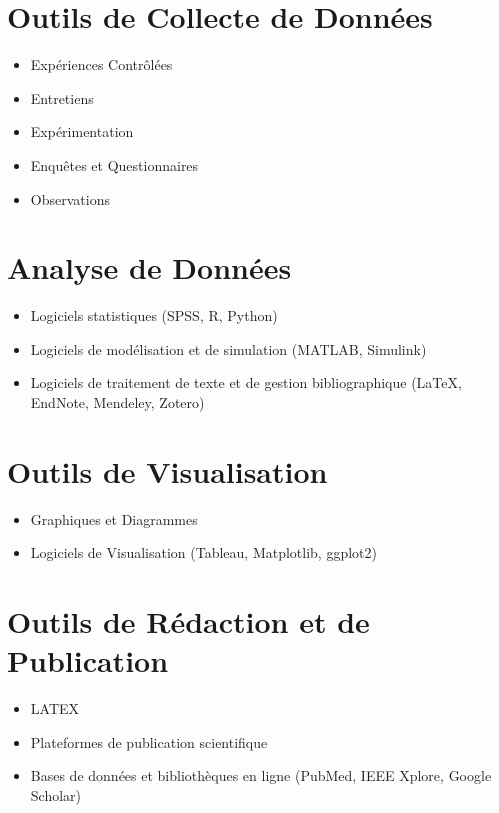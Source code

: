 \documentclass{article}
\begin{document}
\section*{Outils de Collecte de Données}
\begin{itemize}
    \item Expériences Contrôlées
    \item Entretiens
    \item Expérimentation
    \item Enquêtes et Questionnaires
    \item Observations
\end{itemize}

\section*{Analyse de Données}
\begin{itemize}
    \item Logiciels statistiques (SPSS, R, Python)
    \item Logiciels de modélisation et de simulation (MATLAB, Simulink)
    \item Logiciels de traitement de texte et de gestion bibliographique (LaTeX, EndNote, Mendeley, Zotero)
\end{itemize}

\section*{Outils de Visualisation}
\begin{itemize}
    \item Graphiques et Diagrammes
    \item Logiciels de Visualisation (Tableau, Matplotlib, ggplot2)
\end{itemize}

\section*{Outils de Rédaction et de Publication}
\begin{itemize}
    \item LATEX
    \item Plateformes de publication scientifique
    \item Bases de données et bibliothèques en ligne (PubMed, IEEE Xplore, Google Scholar)
\end{itemize}
\end{document}
